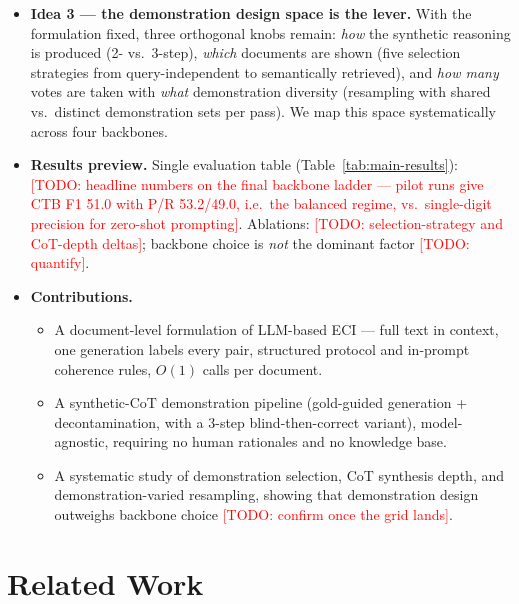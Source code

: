 \documentclass[11pt]{article}
\newcommand{\todo}[1]{\textcolor{red}{[TODO: #1]}}
\begin{document}
\begin{itemize}
\begin{itemize}
                demo document.
        \end{itemize}
  \item \textbf{Idea 3 --- the demonstration design space is the lever.} With
        the formulation fixed, three orthogonal knobs remain: \emph{how} the
        synthetic reasoning is produced (2- vs.\ 3-step), \emph{which}
        documents are shown (five selection strategies from query-independent
        to semantically retrieved), and \emph{how many} votes are taken with
        \emph{what} demonstration diversity (resampling with shared vs.\
        distinct demonstration sets per pass). We map this space systematically
        across four backbones.
  \item \textbf{Results preview.} Single evaluation table
        (Table~\ref{tab:main-results}): \todo{headline numbers on the final
        backbone ladder --- pilot runs give CTB F1 51.0 with P/R 53.2/49.0,
        i.e.\ the balanced regime, vs.\ single-digit precision for zero-shot
        prompting}. Ablations: \todo{selection-strategy and CoT-depth deltas};
        backbone choice is \emph{not} the dominant factor \todo{quantify}.
  \item \textbf{Contributions.}
        \begin{itemize}
          \item A document-level formulation of LLM-based ECI --- full text in
                context, one generation labels every pair, structured protocol
                and in-prompt coherence rules, $O(1)$ calls per document.
          \item A synthetic-CoT demonstration pipeline (gold-guided generation +
                decontamination, with a 3-step blind-then-correct variant),
                model-agnostic, requiring no human rationales and no knowledge
                base.
          \item A systematic study of demonstration selection, CoT synthesis
                depth, and demonstration-varied resampling, showing that
                demonstration design outweighs backbone choice
                \todo{confirm once the grid lands}.
        \end{itemize}
\end{itemize}

\section{Related Work}
\label{sec:related}
\end{document}
